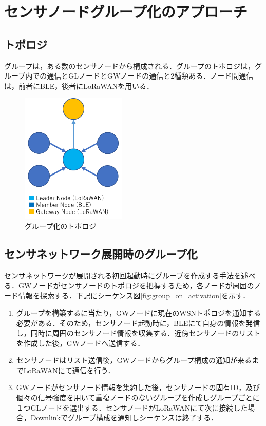 \section{センサノードグループ化のアプローチ}

\subsection{トポロジ}
グループは，ある数のセンサノードから構成される．グループのトポロジは，グループ内での通信とGLノードとGWノードの通信と2種類ある．ノード間通信は，前者にBLE，後者にLoRaWANを用いる．

\begin{figure}[]
    \begin{center}
    \includegraphics[width=5cm]{figures/グループ化のトポロジ.png}
    \caption{グループ化のトポロジ}
    \label{fig:group_topology}
    \end{center}
\end{figure}

\subsection{センサネットワーク展開時のグループ化}
センサネットワークが展開される初回起動時にグループを作成する手法を述べる．GWノードがセンサノードのトポロジを把握するため，各ノードが周囲のノード情報を探索する．下記にシーケンス図\ref{fig:group_on_activation}を示す．

\begin{enumerate}
    \item グループを構築するに当たり，GWノードに現在のWSNトポロジを通知する必要がある．そのため，センサノード起動時に，BLEにて自身の情報を発信し，同時に周囲のセンサノード情報を収集する．近傍センサノードのリストを作成した後，GWノードへ送信する．
    \item センサノードはリスト送信後，GWノードからグループ構成の通知が来るまでLoRaWANにて通信を行う．
    \item GWノードがセンサノード情報を集約した後，センサノードの固有ID，及び個々の信号強度を用いて重複ノードのないグループを作成しグループごとに１つGLノードを選出する．センサノードがLoRaWANにて次に接続した場合，Downlinkでグループ構成を通知しシーケンスは終了する．
\end{enumerate}

